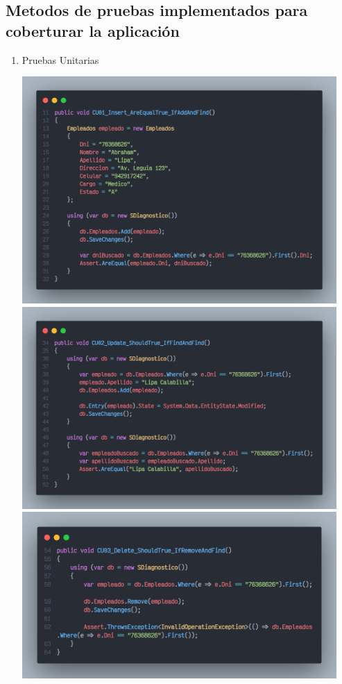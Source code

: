 \documentclass[preprint,12pt]{elsarticle}
\begin{document}
\subsection{\textbf{  Metodos de pruebas implementados para coberturar la aplicación }}
\renewcommand{\labelenumi}{{\theenumi}}
\begin{enumerate}

\item  Pruebas Unitarias  

\begin{center}
	\includegraphics[width=12cm]{./imagen/code_1.png} 
	\includegraphics[width=12cm]{./imagen/code_2.png} 
	\includegraphics[width=12cm]{./imagen/code_3.png} 
	\end{center}


\end{enumerate}
\end{document}
